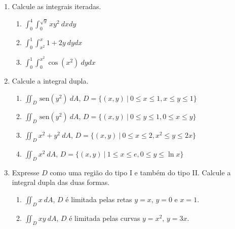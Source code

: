 \documentclass[a4paper,5pt]{amsbook}
\newcommand{\sen}{\,\mbox{sen}}
\newcommand{\ds}{\displaystyle}
\begin{document}
\vspace{1cm}
\begin{enumerate}
    \setlength\itemsep{0.5cm}
    \item Calcule as integrais iteradas.
        \begin{enumerate}
            \setlength\itemsep{0.3cm}
            \item $\ds\int_0^4\int_0^{\sqrt{y}} xy^2\ dxdy$
            \item $\ds\int_0^1\int_{x^2}^x 1+2y\ dydx$
            \item $\ds\int_0^1\int_0^{x^2} \cos{(x^2)}\ dydx$
        \end{enumerate}

    \item Calcule a integral dupla.
        \begin{enumerate}
            \setlength\itemsep{0.3cm}
            \item $\ds\iint_D \sen{(y^2)}\ dA$, $D=\{(x,y)\ |\ 0\le x\le 1, x\le
            y\le 1\}$
            \item $\ds\iint_D \sen{(y^2)}\ dA$, $D=\{(x,y)\ |\ 0\le y\le 1,
            0\le x\le y\}$
            \item $\ds\iint_D x^2+y^2\ dA$, $D=\{(x,y)\ |\ 0\le x\le 2, x^2\le
            y\le 2x\}$
            \item $\ds\iint_D x^2\ dA$, $D=\{(x,y)\ |\ 1\le x\le e, 0\le y\le
            \ln{x}\}$
        \end{enumerate}

    \item Expresse $D$ como uma regi\~ao do tipo I e tamb\'em do tipo II. Calcule a
    integral dupla das duas formas.
        \begin{enumerate}
            \setlength\itemsep{0.3cm}
            \item $\ds\iint_D x\ dA$, $D$ \'e limitada pelas retas $y=x$, $y=0$ e
            $x=1$.
            \item $\ds\iint_D xy\ dA$, $D$ \'e limitada pelas curvas $y=x^2$,
            $y=3x$.
        \end{enumerate}
\end{enumerate}
\end{document}
